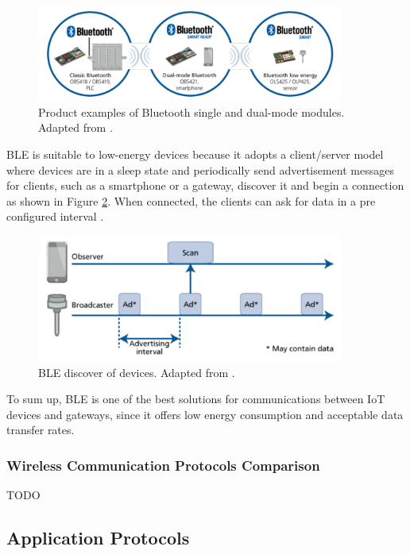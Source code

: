 \begin{figure}[H]
	\centering
	\includegraphics[width=0.9\textwidth]{figures/ble.png}
	\caption{Product examples of Bluetooth single and dual-mode modules. Adapted from \cite{Andersson2014}.}
	\label{fig:ble1}
\end{figure}

BLE is suitable to low-energy devices because it adopts a client/server model where devices are in a sleep state and periodically send advertisement messages for clients, such as a smartphone or a gateway, discover it and begin a connection as shown in Figure \ref{fig:ble2}. When connected, the clients can ask for data in a pre configured interval \cite{Andersson2014}. 

\begin{figure}[H]
	\centering
	\includegraphics[width=0.9\textwidth]{figures/ble2.png}
	\caption{BLE discover of devices. Adapted from \cite{Andersson2014}.}
	\label{fig:ble2}
\end{figure}

To sum up, BLE is one of the best solutions for communications between IoT devices and gateways, since it offers low energy consumption and acceptable data transfer rates.

\subsubsection{Wireless Communication Protocols Comparison}
TODO  

\subsection{Application Protocols}

